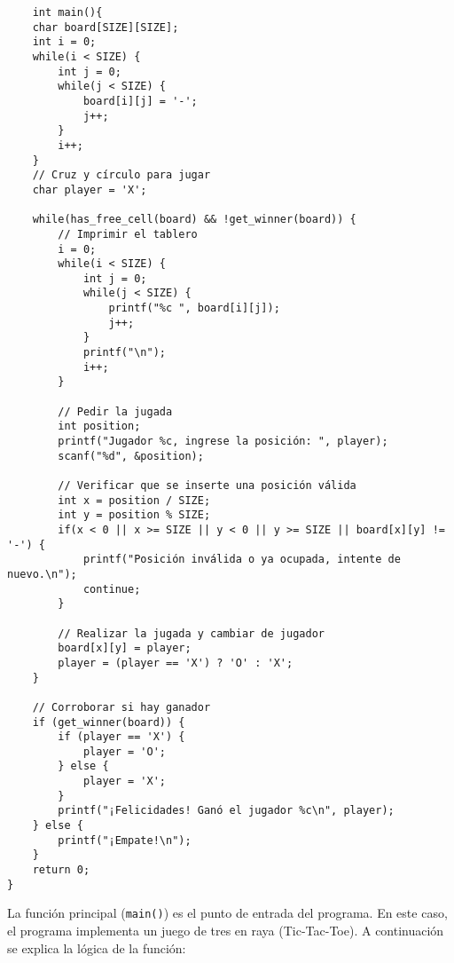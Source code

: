 \begin{verbatim}
    int main(){
    char board[SIZE][SIZE];
    int i = 0;
    while(i < SIZE) {
        int j = 0;
        while(j < SIZE) {
            board[i][j] = '-';
            j++;
        }
        i++;
    }
    // Cruz y círculo para jugar
    char player = 'X';

    while(has_free_cell(board) && !get_winner(board)) {
        // Imprimir el tablero
        i = 0;
        while(i < SIZE) {
            int j = 0;
            while(j < SIZE) {
                printf("%c ", board[i][j]);
                j++;
            }
            printf("\n");
            i++;
        }

        // Pedir la jugada
        int position;
        printf("Jugador %c, ingrese la posición: ", player);
        scanf("%d", &position);

        // Verificar que se inserte una posición válida
        int x = position / SIZE;
        int y = position % SIZE;
        if(x < 0 || x >= SIZE || y < 0 || y >= SIZE || board[x][y] != '-') {
            printf("Posición inválida o ya ocupada, intente de nuevo.\n");
            continue;
        }

        // Realizar la jugada y cambiar de jugador
        board[x][y] = player;
        player = (player == 'X') ? 'O' : 'X';
    }
    
    // Corroborar si hay ganador
    if (get_winner(board)) {
        if (player == 'X') {
            player = 'O';
        } else {
            player = 'X';
        }
        printf("¡Felicidades! Ganó el jugador %c\n", player);
    } else {
        printf("¡Empate!\n");
    }
    return 0;
}
\end{verbatim}

La función principal (\texttt{main()}) es el punto de entrada del programa. En este caso, el programa implementa un juego de tres en raya (Tic-Tac-Toe). A continuación se explica la lógica de la función:

